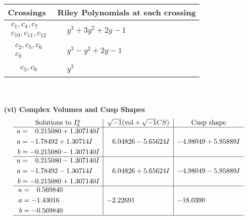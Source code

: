 \documentclass[1p]{elsarticle_modified}
\theoremstyle{definition}
\newcommand{\I}{\sqrt{-1}}
\begin{document}
\begin{tabular}{m{50pt}|m{274pt}}
Crossings & \hspace{64pt}Riley Polynomials at each crossing \\
\hline $$\begin{aligned}c_{1},c_{4},c_{7}\\c_{10},c_{11},c_{12}\end{aligned}$$&$\begin{aligned}
&y^3+3 y^2+2 y-1
\end{aligned}$\\
\hline $$\begin{aligned}c_{2},c_{5},c_{6}\\c_{8}\end{aligned}$$&$\begin{aligned}
&y^3- y^2+2 y-1
\end{aligned}$\\
\hline $$\begin{aligned}c_{3},c_{9}\end{aligned}$$&$\begin{aligned}
&y^3
\end{aligned}$\\
\hline
\end{tabular}\\~\\
\newpage\flushleft \textbf{(vi) Complex Volumes and Cusp Shapes}
$$\begin{array}{c|c|c}  
\text{Solutions to }I^u_{3}& \I (\text{vol} + \sqrt{-1}CS) & \text{Cusp shape}\\
 \hline 
\begin{aligned}
u &= \phantom{-}0.215080 + 1.307140 I \\
a &= -1.78492 + 1.30714 I \\
b &= -0.215080 - 1.307140 I\end{aligned}
 & \phantom{-}6.04826 - 5.65624 I & -4.98049 + 5.95889 I \\ \hline\begin{aligned}
u &= \phantom{-}0.215080 - 1.307140 I \\
a &= -1.78492 - 1.30714 I \\
b &= -0.215080 + 1.307140 I\end{aligned}
 & \phantom{-}6.04826 + 5.65624 I & -4.98049 - 5.95889 I \\ \hline\begin{aligned}
u &= \phantom{-}0.569840\phantom{ +0.000000I} \\
a &= -1.43016\phantom{ +0.000000I} \\
b &= -0.569840\phantom{ +0.000000I}\end{aligned}
 & -2.22691\phantom{ +0.000000I} & -18.0390\phantom{ +0.000000I}\\
 \hline 
 \end{array}$$\newpage\newpage\renewcommand{\arraystretch}{1}
\end{document}
